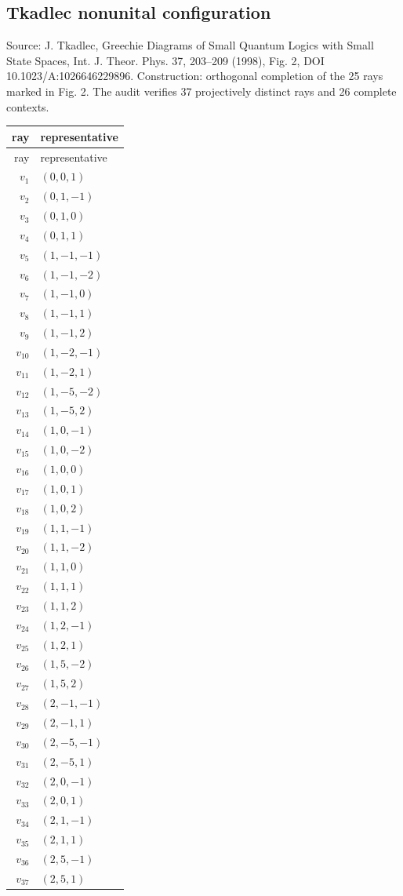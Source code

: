 \subsection{Tkadlec nonunital configuration}
\begingroup\sloppy Source: J. Tkadlec, Greechie Diagrams of Small Quantum Logics with Small State Spaces, Int. J. Theor. Phys. 37, 203--209 (1998), Fig. 2, DOI 10.1023/A:1026646229896.  Construction: orthogonal completion of the 25 rays marked in Fig. 2. The audit verifies 37 projectively distinct rays and 26 complete contexts.\par\endgroup
\begin{longtable}{@{}r l@{}}
\toprule
ray & representative\\
\midrule
\endfirsthead
\toprule
ray & representative\\
\midrule
\endhead
$v_{1}$ & $(0,0,1)$\\
$v_{2}$ & $(0,1,-1)$\\
$v_{3}$ & $(0,1,0)$\\
$v_{4}$ & $(0,1,1)$\\
$v_{5}$ & $(1,-1,-1)$\\
$v_{6}$ & $(1,-1,-2)$\\
$v_{7}$ & $(1,-1,0)$\\
$v_{8}$ & $(1,-1,1)$\\
$v_{9}$ & $(1,-1,2)$\\
$v_{10}$ & $(1,-2,-1)$\\
$v_{11}$ & $(1,-2,1)$\\
$v_{12}$ & $(1,-5,-2)$\\
$v_{13}$ & $(1,-5,2)$\\
$v_{14}$ & $(1,0,-1)$\\
$v_{15}$ & $(1,0,-2)$\\
$v_{16}$ & $(1,0,0)$\\
$v_{17}$ & $(1,0,1)$\\
$v_{18}$ & $(1,0,2)$\\
$v_{19}$ & $(1,1,-1)$\\
$v_{20}$ & $(1,1,-2)$\\
$v_{21}$ & $(1,1,0)$\\
$v_{22}$ & $(1,1,1)$\\
$v_{23}$ & $(1,1,2)$\\
$v_{24}$ & $(1,2,-1)$\\
$v_{25}$ & $(1,2,1)$\\
$v_{26}$ & $(1,5,-2)$\\
$v_{27}$ & $(1,5,2)$\\
$v_{28}$ & $(2,-1,-1)$\\
$v_{29}$ & $(2,-1,1)$\\
$v_{30}$ & $(2,-5,-1)$\\
$v_{31}$ & $(2,-5,1)$\\
$v_{32}$ & $(2,0,-1)$\\
$v_{33}$ & $(2,0,1)$\\
$v_{34}$ & $(2,1,-1)$\\
$v_{35}$ & $(2,1,1)$\\
$v_{36}$ & $(2,5,-1)$\\
$v_{37}$ & $(2,5,1)$\\
\bottomrule
\end{longtable}
